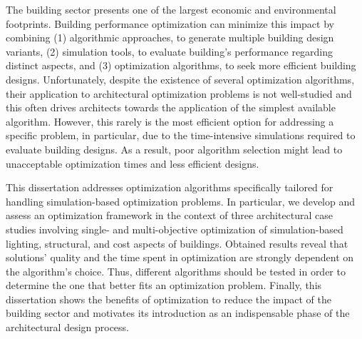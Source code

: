 \noindent 

The building sector presents one of the largest economic and environmental footprints. Building performance optimization can minimize this impact by combining (1) algorithmic approaches, to generate multiple building design variants, (2) simulation tools, to evaluate building's performance regarding distinct aspects, and (3) optimization algorithms, to seek more efficient building designs. Unfortunately, despite the existence of several optimization algorithms, their application to architectural optimization problems is not well-studied and this often drives architects towards the application of the simplest available algorithm. However, this rarely is the most efficient option for addressing a specific problem, in particular, due to the time-intensive simulations required to evaluate building designs. As a result, poor algorithm selection might lead to unacceptable optimization times and less efficient designs. 

This dissertation addresses optimization algorithms specifically tailored for handling simulation-based optimization problems. In particular, we develop and assess an optimization framework in the context of three architectural case studies involving single- and multi-objective optimization of simulation-based lighting, structural, and cost aspects of buildings. Obtained results reveal that solutions' quality and the time spent in optimization are strongly dependent on the algorithm's choice. Thus, different algorithms should be tested in order to determine the one that better fits an optimization problem. Finally, this dissertation shows the benefits of optimization to reduce the impact of the building sector and motivates its introduction as an indispensable phase of the architectural design process.
